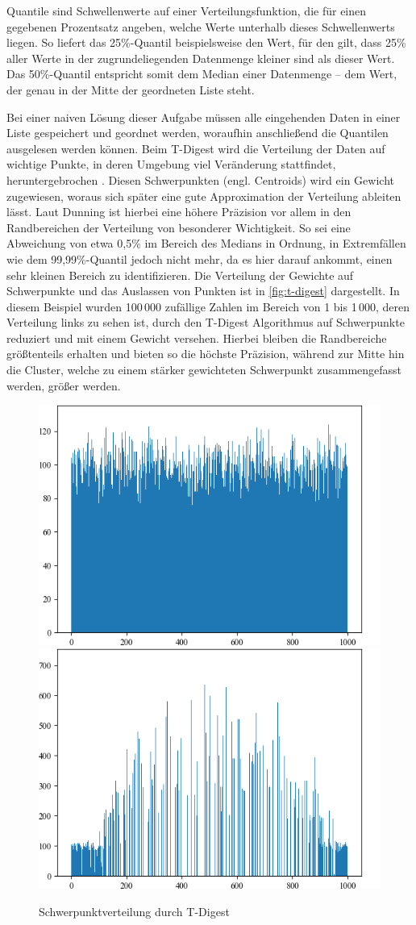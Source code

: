 Quantile sind Schwellenwerte auf einer Verteilungsfunktion, die für einen gegebenen Prozentsatz angeben, welche Werte unterhalb dieses Schwellenwerts liegen.
So liefert das 25\%-Quantil beispielsweise den Wert, für den gilt, dass 25\% aller Werte in der zugrundeliegenden Datenmenge kleiner sind als dieser Wert.
Das 50\%-Quantil entspricht somit dem Median einer Datenmenge -- dem Wert, der genau in der Mitte der geordneten Liste steht.

Bei einer naiven Lösung dieser Aufgabe müssen alle eingehenden Daten in einer Liste gespeichert und geordnet werden, woraufhin anschließend die Quantilen ausgelesen werden können.
Beim T-Digest wird die Verteilung der Daten auf wichtige Punkte, in deren Umgebung viel Veränderung stattfindet, heruntergebrochen \cite{davidsonpilon2015}.
Diesen Schwerpunkten (engl. Centroids) wird ein Gewicht zugewiesen, woraus sich später eine gute Approximation der Verteilung ableiten lässt.
Laut Dunning \cite{dunning2015} ist hierbei eine höhere Präzision vor allem in den Randbereichen der Verteilung von besonderer Wichtigkeit.
So sei eine Abweichung von etwa 0,5\% im Bereich des Medians in Ordnung, in Extremfällen wie dem 99,99\%-Quantil jedoch nicht mehr, da es hier darauf ankommt, einen sehr kleinen Bereich zu identifizieren.
Die Verteilung der Gewichte auf Schwerpunkte und das Auslassen von Punkten ist in \autoref{fig:t-digest} dargestellt.
In diesem Beispiel wurden 100\,000 zufällige Zahlen im Bereich von 1 bis 1\,000, deren Verteilung links zu sehen ist, durch den T-Digest Algorithmus auf Schwerpunkte reduziert und mit einem Gewicht versehen.
Hierbei bleiben die Randbereiche größtenteils erhalten und bieten so die höchste Präzision, während zur Mitte hin die Cluster, welche zu einem stärker gewichteten Schwerpunkt zusammengefasst werden, größer werden.

\begin{figure}[b]
	\centering
	\includegraphics[width=.49\linewidth]{images/t_digest_data.png}
	\includegraphics[width=.49\linewidth]{images/t_digest_sorted.png}
	\caption{Schwerpunktverteilung durch T-Digest}
	\label{fig:t-digest}
\end{figure}

